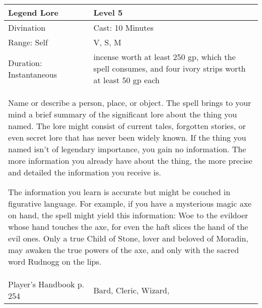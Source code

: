 \documentclass[11pt]{report}
\begin{document}
\begin{table}[H]
	\begin{tabular}{||p{6cm}|p{6cm}||}
		\hline\hline
		\bf{Legend Lore} & Level 5\\ \hline
		Divination & Cast: 10 Minutes\\ \hline
		Range: Self & V, S, M\\ \hline
		Duration: Instantaneous & incense worth at least 250 gp, which the spell consumes, and four ivory strips worth at least 50 gp each\\ \hline
		\multicolumn{2}{||p{12cm}||}{Name or describe a person, place, or object. The spell brings to your mind a brief summary of the significant lore about the thing you named. The lore might consist of current tales, forgotten stories, or even secret lore that has never been widely known. If the thing you named isn’t of legendary importance, you gain no information. The more information you already have about the thing, the more precise and detailed the information you receive is.

The information you learn is accurate but might be couched in figurative language. For example, if you have a mysterious magic axe on hand, the spell might yield this information: Woe to the evildoer whose hand touches the axe, for even the haft slices the hand of the evil ones. Only a true Child of Stone, lover and beloved of Moradin, may awaken the true powers of the axe, and only with the sacred word Rudnogg on the lips.}\\ \hline
Player's Handbook p. 254 & Bard, Cleric, Wizard, \\ \hline\hline
	\end{tabular}
\end{table}
\end{document}
